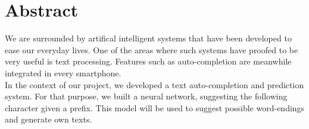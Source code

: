 \documentclass[11pt,a4paper,bibliography=totocnumbered,listof=totocnumbered]{scrartcl}
\begin{document}
\tableofcontents %

\newpage %



\renewcommand{\sectionmark}[1]{\markright{#1}}
\renewcommand{\subsectionmark}[1]{}
\renewcommand{\subsubsectionmark}[1]{}
\rhead{\rightmark}

\onehalfspacing
\renewcommand{\thesection}{\arabic{section}}
\renewcommand{\theHsection}{\arabic{section}}
\setcounter{section}{0}
\setcounter{page}{1}


\section{Abstract}
We are surrounded by artifical intelligent systems that have been developed to ease our everyday lives. One of the areas where such systems have proofed to be very useful is text processing. Features such as auto-completion are meanwhile integrated in every smartphone. \\
In the context of our project, we developed a text auto-completion and prediction system. For that purpose, we built a neural network, suggesting the following character given a prefix. This model will be used to suggest possible word-endings and generate own texts.
\cite{Chung-et-al-TR2014}
\end{document}
